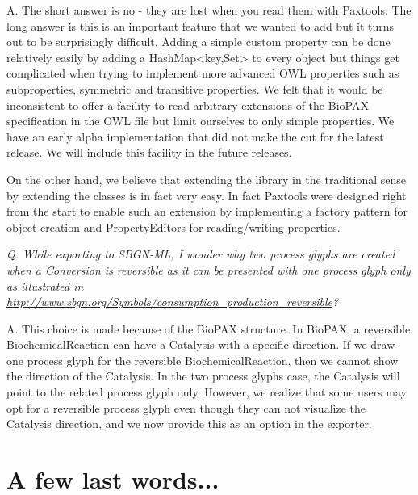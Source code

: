 \documentclass{tufte-book}
\begin{document}
A. The short answer is no - they are lost when you read them with Paxtools. The long answer is this is an important feature that we wanted to add but it turns out to be surprisingly difficult. Adding a simple custom property can be done relatively easily by adding a HashMap<key,Set> to every object but things get complicated when trying to implement more advanced OWL properties such as subproperties, symmetric and transitive properties. We felt that it would be inconsistent to offer a facility to read arbitrary extensions of the BioPAX specification in the OWL file but limit ourselves to only simple properties. We have an early alpha implementation that did not make the cut for the latest release. We will include this facility in the future releases.

On the other hand, we believe that extending the library in the traditional sense by extending the classes is in fact very easy. In fact Paxtools were designed right from the start to enable such an extension by implementing a factory pattern for object creation and PropertyEditors for reading/writing properties.

\textit{Q.  While exporting to SBGN-ML, I wonder why two process glyphs are created when a Conversion is reversible as it can be presented with one process glyph only as illustrated in \url{http://www.sbgn.org/Symbols/consumption_production_reversible}?}

A. This choice is made because of the BioPAX structure. In BioPAX, a reversible BiochemicalReaction can have a Catalysis with a specific direction. If we draw one process glyph for the reversible BiochemicalReaction, then we cannot show the direction of the Catalysis. In the two process glyphs case, the Catalysis will point to the related process glyph only. However, we realize that some users may opt for a reversible process glyph even though they can not visualize the Catalysis direction, and we now provide this as an option in the exporter. 


\chapter{A few last words...}
\end{document}
